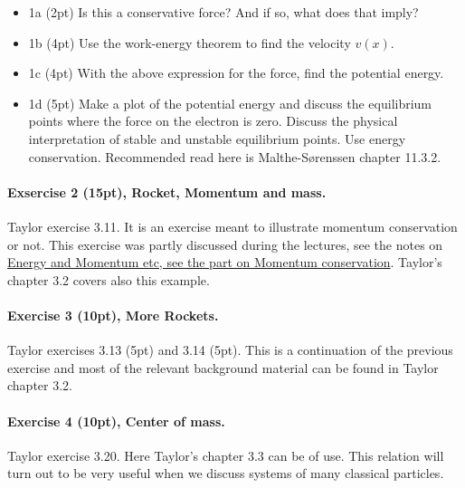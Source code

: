\documentclass[%
oneside,                 %
final,                   %
10pt]{article}
\begin{document}
\begin{itemize}
\item 1a (2pt) Is this a conservative force? And if so, what does that imply?

\item 1b (4pt) Use the work-energy theorem to find the velocity $v(x)$. 

\item 1c (4pt) With the above expression for the force, find the potential energy.

\item 1d (5pt) Make a plot of the potential energy and discuss the equilibrium points where the force on the electron is zero. Discuss the physical interpretation of stable and unstable equilibrium points. Use energy conservation. Recommended read here  is Malthe-Sørenssen chapter 11.3.2.
\end{itemize}

\noindent
\paragraph{Exsercise 2 (15pt), Rocket, Momentum and mass.}
Taylor exercise 3.11.   It is an exercise meant to illustrate momentum conservation or not. 
This exercise was partly discussed during the lectures, see the notes on \href{{https://mhjensen.github.io/Physics321/doc/pub/energyconserv/html/energyconserv.html}}{Energy and Momentum etc, see the part on Momentum conservation}. Taylor's chapter 3.2 covers also this example.


\paragraph{Exercise 3 (10pt), More Rockets.}
Taylor exercises 3.13 (5pt) and 3.14 (5pt). This is a continuation of the previous exercise and most of the relevant background material can be found in Taylor chapter 3.2. 

\paragraph{Exercise 4 (10pt), Center of mass.}
Taylor exercise 3.20. Here Taylor's chapter 3.3 can be of use. This relation will turn out to be very useful when we discuss systems of many classical particles.
\end{document}
